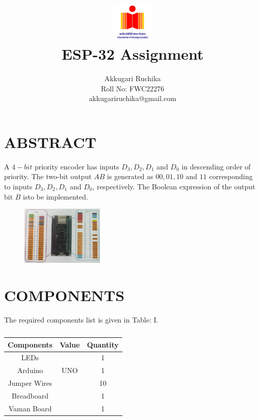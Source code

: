 \documentclass[conference]{IEEEtran}
\title{
\vspace{1cm}
{\includegraphics[width=0.15\textwidth]{iithlogo.jpg} \\ ESP-32 Assignment} }
\author{Akkugari Ruchika \\ Roll No: FWC22276 \\ akkugariruchika@gmail.com}
\begin{document}
\maketitle
 \section {ABSTRACT}
 A $4-bit$ priority encoder has inputs $D_3, D_2, D_1$ and $D_0$ in descending order of priority. The two-bit output $AB$ is generated as $00, 01, 10$ and $11$ corresponding to inputs $D_3, D_2, D_1$ and $D_0$, respectively. The Boolean expression of the output bit $B$ isto be implemented.
 \begin{figure}[h]
	 \centering
	 \includegraphics[width=0.35\textwidth]{vaman.jpg}
	 \caption{\label{fig:Esp-32 in vaman board}}
 \end{figure}
\section{COMPONENTS}
The required components list is given in Table: I. 
 \begin{table} [htbp]
\centering
\begin{tabular}{| c | c | c |} \hline
Components & Value & Quantity \\\hline
LEDs &  & 1 \\ \hline
Arduino & UNO & 1 \\ \hline
Jumper Wires &  & 10 \\ \hline
Breadboard & & 1 \\ \hline
	Vaman Board & & 1\\
\hline
\end{tabular}
\vspace{0.1cm}
\caption{\label{tab:widgets}}
\end{table}
\end{document}
